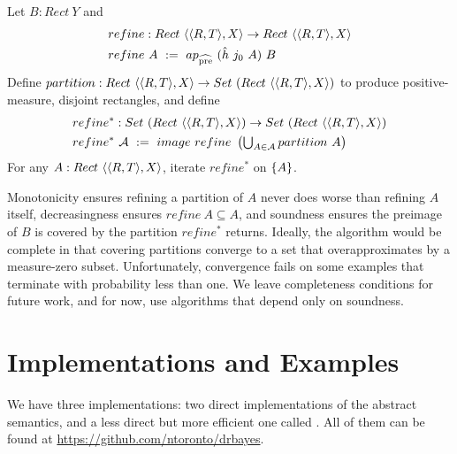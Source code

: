 \documentclass{llncs}
\newcommand{\prehat}{_\mathrm{\widehat{pre}}}
\begin{document}
\begin{definition}
\label{def:preimage-refinement}
Let $B : Rect~Y$ and
\begin{equation}
\begin{aligned}
	&refine : Rect~\pair{\pair{R,T},X} \to Rect~\pair{\pair{R,T},X} \\
	&refine~A \ := \ ap\prehat~(\hat{h}~j_0~A)~B
\end{aligned}
\end{equation}
Define $partition : Rect~\langle{\langle{R,T}\rangle,X}\rangle \to Set~(Rect~\langle{\langle{R,T}\rangle,X}\rangle)$ to produce positive-measure, disjoint rectangles, and define
\begin{equation}
\begin{aligned}
	&refine^* : Set~(Rect~\langle{\langle{R,T}\rangle,X}\rangle) \to Set~(Rect~\langle{\langle{R,T}\rangle,X}\rangle) \\
	&refine^*~\mathcal{A} \ := \ image~refine~\left(\textstyle\bigcup_{A \in \mathcal{A}} partition~A \right)
\end{aligned}
\end{equation}
For any $A : Rect~\langle{\langle{R,T}\rangle,X}\rangle$, iterate $refine^*$ on $\{{A}\}$.
\end{definition}

Monotonicity ensures refining a partition of $A$ never does worse than refining $A$ itself, decreasingness ensures $refine~A \subseteq A$, and soundness ensures the preimage of $B$ is covered by the partition $refine^*$ returns.
Ideally, the algorithm would be complete in that covering partitions converge to a set that overapproximates by a measure-zero subset.
Unfortunately, convergence fails on some examples that terminate with probability less than one.
We leave completeness conditions for future work, and for now, use algorithms that depend only on soundness.


\section{Implementations and Examples}
\label{sec:implementation}

We have three implementations: two direct implementations of the abstract semantics, and a less direct but more efficient one called .
All of them can be found at \url{https://github.com/ntoronto/drbayes}.
\end{document}
